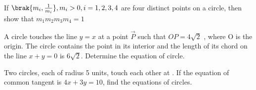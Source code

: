 \hfill {}
\item If $\brak{ m_i, \frac{1}{m_i}}, m_i > 0, i = 1, 2, 3, 4$ are four distinct points on a circle, then show that $m_1m_2m_3m_4=1$

\hfill {}
\item A circle touches the line $y=x$ at a point $\vec{P}$ such that $OP=4\sqrt{2}$ , where O is the origin. The circle contains the point  in its interior and the length of its chord on the line $x+y=0$ is $6\sqrt{2}$. Determine the equation of circle.

\hfill {}
\item Two circles, each of radius 5 units, touch each other at . If the equation of common tangent is $4x+3y=10$, find the equations of circles.

\hfill {}

